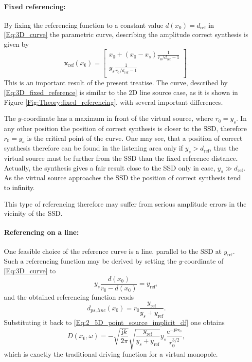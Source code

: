 \documentclass[12pt,a4paper]{article}
\newcommand{\te}{\mathrm{e}}
\newcommand{\ti}{\mathrm{j}}
\newcommand{\yref}{y_{\mathrm{ref}}}
\newcommand{\dref}{d_{\mathrm{ref}}}
\begin{document}
\paragraph{Fixed referencing:\\}
By fixing the referencing function to a constant value $d(x_0) = \dref$ in \eqref{Eq:3D_curve} the parametric curve, describing the amplitude correct synthesis is given by
\begin{equation}
\mathbf{x}_{\mathrm{ref}}(x_0)  =  \begin{bmatrix} x_0 + (x_0-x_s)\frac{1}{r_0/\dref - 1 } \\[0.3em] y_s \frac{1}{r_0/\dref - 1}\\[0.3em]    \end{bmatrix}.
\label{Eq:3D_fixed_reference}
\end{equation}
This is an important result of the present treatise. The curve, described by \eqref{Eq:3D_fixed_reference} is similar to the 2D line source case, as it is shown in Figure \ref{Fig:Theory:fixed_referencing}, with several important differences.

The $y$-coordinate has a maximum in front of the virtual source, where $r_0 = y_s$. In any other position the position of correct synthesis is closer to the SSD, therefore $r_0 = y_s$ is the critical point of the curve. One may see, that a position of correct synthesis therefore can be found in the listening area only if $y_s > \dref$, thus the virtual source must be further from the SSD than the fixed reference distance. Actually, the synthesis gives a fair result close to the SSD only in case, $y_s \gg \dref$. As the virtual source approaches the SSD the position of correct synthesis tend to infinity.

This type of referencing therefore may suffer from serious amplitude errors in the vicinity of the SSD.

\paragraph{Referencing on a line:\\}
One feasible choice of the reference curve is a line, parallel to the SSD at $\yref$. Such a referencing function may be derived by setting the $y$-coordinate of \eqref{Eq:3D_curve} to
\begin{equation}
y_s \frac{d(x_0)}{r_0 - d(x_0)} = \yref,
\end{equation}
and the obtained referencing function reads
\begin{equation}
d_{ps,line}(x_0) = r_0 \frac{\yref}{y_s + \yref}.
\end{equation}
Substituting it back to \eqref{Eq:2_5D_point_source_implicit_df} one obtains
\begin{equation}
D(x_0,\omega) = 
- \sqrt{\frac{\ti k}{2\pi}} \sqrt{\frac{\yref}{y_s + \yref}}  y_s \frac{\te^{-\ti k r_0 }}{r_0^{3/2}},
\end{equation}
which is exactly the traditional driving function for a virtual monopole.
\end{document}
